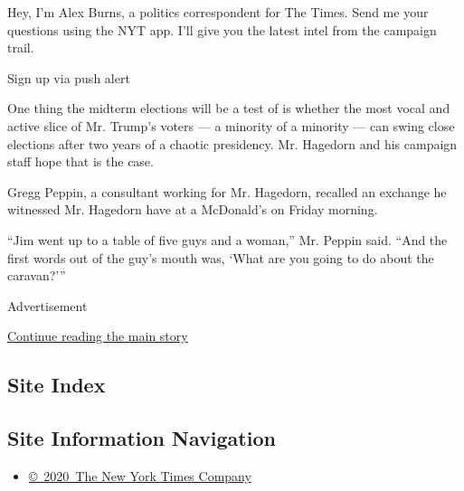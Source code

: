 Hey, I'm Alex Burns, a politics correspondent for The Times. Send me
your questions using the NYT app. I'll give you the latest intel from
the campaign trail.

Sign up via push alert

One thing the midterm elections will be a test of is whether the most
vocal and active slice of Mr. Trump's voters --- a minority of a
minority --- can swing close elections after two years of a chaotic
presidency. Mr. Hagedorn and his campaign staff hope that is the case.

Gregg Peppin, a consultant working for Mr. Hagedorn, recalled an
exchange he witnessed Mr. Hagedorn have at a McDonald's on Friday
morning.

``Jim went up to a table of five guys and a woman,'' Mr. Peppin said.
``And the first words out of the guy's mouth was, `What are you going to
do about the caravan?'''

Advertisement

\protect\hyperlink{after-bottom}{Continue reading the main story}

\hypertarget{site-index}{%
\subsection{Site Index}\label{site-index}}

\hypertarget{site-information-navigation}{%
\subsection{Site Information
Navigation}\label{site-information-navigation}}

\begin{itemize}
\tightlist
\item
  \href{https://help.nytimes3xbfgragh.onion/hc/en-us/articles/115014792127-Copyright-notice}{©~2020~The
  New York Times Company}
\end{itemize}

